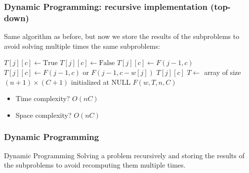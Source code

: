 \documentclass{beamer}
\begin{document}
\begin{frame}
  \frametitle{Dynamic Programming: recursive implementation (top-down)}

  \footnotesize
  Same algorithm as before, but now we store the results of the subproblems to avoid solving multiple times the same subproblems:
  \begin{minipage}[t]{0.75\linewidth}
    \footnotesize
    \begin{algorithmic}
      \State$T[j][c] \gets \text{True}$
      \Else{}
      \State$T[j][c] \gets \text{False}$
      \EndIf
      \State$T[j][c] \gets F(j - 1, c)$
      \Else{}
      \State$T[j][c] \gets F(j - 1, c) \text{ or } F(j - 1, c - w[j])$
      \EndIf
      \EndIf
      \State\Return$T[j][c]$
      \EndProcedure{}
      \State$T \gets$ array of size $(n + 1) \times (C + 1)$ initialized at NULL
      \State\Return$F(w, T, n, C)$
      \EndProcedure{}
    \end{algorithmic}
  \end{minipage}
  \hfill
  \begin{minipage}[t]{0.24\linewidth}
    \footnotesize
    \begin{itemize}
      \item \pause Time complexity? \pause $O(nC)$
      \item \pause Space complexity? \pause $O(nC)$
    \end{itemize}
  \end{minipage}
\end{frame}

\begin{frame}
  \frametitle{Dynamic Programming}

  \begin{block}{Dynamic Programming}
    Solving a problem recursively and storing the results of the subproblems to avoid recomputing them multiple times.
  \end{block}
\end{frame}
\end{document}

